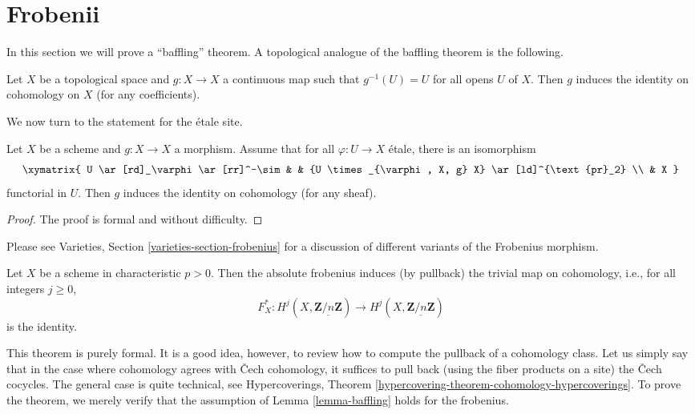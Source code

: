 \section{Frobenii}
\label{section-frobenii}

\noindent
In this section we will prove a ``baffling'' theorem.
A topological analogue of the baffling theorem is the following.

\begin{exercise}
\label{exercise-baffling}
Let $X$ be a topological space and $g : X \to X$ a continuous map such that
$g^{-1}(U) = U$ for all opens $U$ of $X$. Then $g$ induces the identity on
cohomology on $X$ (for any coefficients).
\end{exercise}

\noindent
We now turn to the statement for the \'etale site.

\begin{lemma}
\label{lemma-baffling}
Let $X$ be a scheme and $g : X \to X$ a morphism. Assume that for all
$\varphi : U \to X$ \'etale, there is an isomorphism
$$
\xymatrix{
U \ar[rd]_\varphi \ar[rr]^-\sim & & {U
\times_{\varphi, X, g} X} \ar[ld]^{\text{pr}_2} \\
& X
}
$$
functorial in $U$. Then $g$ induces the identity on cohomology (for any sheaf).
\end{lemma}

\begin{proof}
The proof is formal and without difficulty.
\end{proof}

\noindent
Please see Varieties, Section \ref{varieties-section-frobenius}
for a discussion of different variants of the Frobenius morphism.

\begin{theorem}
\label{theorem-baffling}
Let $X$ be a scheme in characteristic $p > 0$. Then the absolute frobenius
induces (by pullback) the trivial map on cohomology, i.e., for all
integers $j\geq 0$,
$$
F_X^* : H^j (X, \underline{\mathbf{Z}/n\mathbf{Z}}) \longrightarrow H^j (X,
\underline{\mathbf{Z}/n\mathbf{Z}})
$$
is the identity.
\end{theorem}

\noindent
This theorem is purely formal. It is a good idea, however, to review how to
compute the pullback of a cohomology class. Let us simply say that in the case
where cohomology agrees with {\v C}ech cohomology, it suffices to pull back
(using the fiber products on a site) the {\v C}ech cocycles. The general case is
quite technical, see
Hypercoverings, Theorem \ref{hypercovering-theorem-cohomology-hypercoverings}.
To prove the theorem, we merely
verify that the assumption of Lemma \ref{lemma-baffling}
holds for the frobenius.

